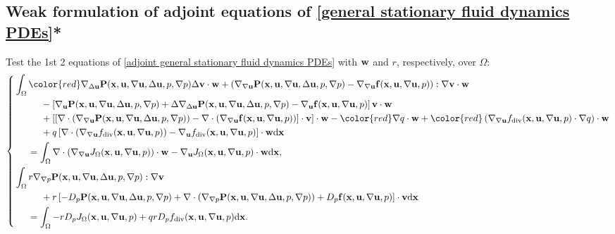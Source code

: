 \documentclass[oneside]{book}
\numberwithin{equation}{section}
\begin{document}
\subsection{Weak formulation of adjoint equations of \eqref{general stationary fluid dynamics PDEs}*}
Test the 1st 2 equations of \eqref{adjoint general stationary fluid dynamics PDEs} with ${\bf w}$ and $r$, respectively, over $\Omega$:
\begin{equation*}
    \left\{\begin{split}
        &\int_\Omega {\color{red}\nabla_{\Delta{\bf u}}{\bf P}({\bf x},{\bf u},\nabla{\bf u},\Delta{\bf u},p,\nabla p)\Delta{\bf v}\cdot{\bf w}} + \left(\nabla_{\nabla{\bf u}}{\bf P}({\bf x},{\bf u},\nabla{\bf u},\Delta{\bf u},p,\nabla p) - \nabla_{\nabla{\bf u}}{\bf f}({\bf x},{\bf u},\nabla{\bf u},p)\right):\nabla{\bf v}\cdot{\bf w}\\
        &\hspace{1cm}- \left[\nabla_{\bf u}{\bf P}({\bf x},{\bf u},\nabla{\bf u},\Delta{\bf u},p,\nabla p) + \Delta\nabla_{\Delta{\bf u}}{\bf P}({\bf x},{\bf u},\nabla{\bf u},\Delta{\bf u},p,\nabla p) - \nabla_{\bf u}{\bf f}({\bf x},{\bf u},\nabla{\bf u},p)\right]{\bf v}\cdot{\bf w}\\
        &\hspace{1cm}+ \left[\left[\nabla\cdot\left(\nabla_{\nabla{\bf u}}{\bf P}({\bf x},{\bf u},\nabla{\bf u},\Delta{\bf u},p,\nabla p)\right) - \nabla\cdot\left(\nabla_{\nabla{\bf u}}{\bf f}({\bf x},{\bf u},\nabla{\bf u},p)\right)\right]\cdot{\bf v}\right]\cdot{\bf w} - {\color{red}\nabla q\cdot{\bf w}} + {\color{red}\left(\nabla_{\nabla{\bf u}}f_{\rm div}({\bf x},{\bf u},\nabla{\bf u},p)\cdot\nabla q\right)\cdot{\bf w}}\\
        &\hspace{1cm}+ q\left[\nabla\cdot\left(\nabla_{\nabla{\bf u}}f_{\rm div}({\bf x},{\bf u},\nabla{\bf u},p)\right) - \nabla_{\bf u}f_{\rm div}({\bf x},{\bf u},\nabla{\bf u},p)\right]\cdot{\bf w}{\rm d}{\bf x}\\
        &\hspace{5mm} = \int_\Omega \nabla\cdot\left(\nabla_{\nabla{\bf u}}J_\Omega({\bf x},{\bf u},\nabla{\bf u},p)\right)\cdot{\bf w} - \nabla_{\bf u}J_\Omega({\bf x},{\bf u},\nabla{\bf u},p)\cdot{\bf w}{\rm d}{\bf x},\\
        &\int_\Omega r\nabla_{\nabla p}{\bf P}({\bf x},{\bf u},\nabla{\bf u},\Delta{\bf u},p,\nabla p):\nabla{\bf v}\\
        &\hspace{1cm} + r\left[-D_p{\bf P}({\bf x},{\bf u},\nabla{\bf u},\Delta{\bf u},p,\nabla p) + \nabla\cdot\left(\nabla_{\nabla p}{\bf P}({\bf x},{\bf u},\nabla{\bf u},\Delta{\bf u},p,\nabla p)\right) + D_p{\bf f}({\bf x},{\bf u},\nabla{\bf u},p)\right]\cdot{\bf v}{\rm d}{\bf x}\\
        &\hspace{5mm} = \int_\Omega - rD_pJ_\Omega ({\bf x},{\bf u},\nabla{\bf u},p) + qrD_pf_{\rm div}({\bf x},{\bf u},\nabla{\bf u},p){\rm d}{\bf x}.
    \end{split}\right.
\end{equation*}
\end{document}
